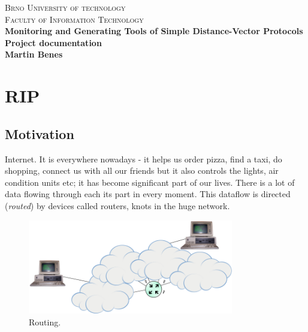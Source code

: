 \documentclass[10pt,a4paper,titlepage]{article}
\begin{document}
    \begin{titlepage}
    
    \begin{center}
    \textsc{\LARGE Brno University of technology}\\[0.5cm]
    \textsc{\large Faculty of Information Technology}\\[8cm]
    
    { \huge \bfseries Monitoring and Generating Tools of Simple Distance-Vector Protocols}\\[0.3cm]
    { \Large \bfseries Project documentation}\\[0.5cm]
    { \bfseries Martin Benes}\\
    
    \end{center}
    
    \end{titlepage}
    \newpage
    
    
    
    \section*{RIP}
    \subsection*{Motivation}
    Internet. It is everywhere nowadays - it helps us order pizza, find a taxi, do shopping,
    connect us with all our friends but it also controls the lights, air condition units etc;
    it has become significant part of our lives. There is a lot of data flowing through each
    its part in every moment. This dataflow is directed ({\it routed}) by devices called routers,
    knots in the huge network.

    \begin{figure}[h!]
        \begin{center}
            \includegraphics[width=0.80\textwidth]{routing.png}
            \caption{ Routing. \label{fig:routing}}
        \end{center}
    \end{figure}
\end{document}
